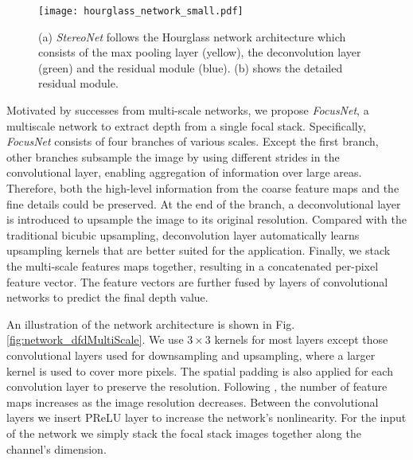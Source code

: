 \documentclass[10pt,twocolumn,letterpaper]{article}
\begin{document}

\begin{figure*}[t]
\begin{center}
   \texttt{[image: hourglass\_network\_small.pdf]}
\end{center}
\vspace{-8pt}
   \caption{(a) \emph{StereoNet} follows the Hourglass network architecture which consists of the max pooling layer (yellow), the deconvolution layer (green) and the residual module (blue). (b) shows the detailed residual module.}
\label{fig:network_hourglass}
\end{figure*}


Motivated by successes from multi-scale networks, we propose \emph{FocusNet}, a multiscale network to extract depth from a single focal stack. Specifically, \emph{FocusNet} consists of four branches of various scales. Except the first branch, other branches subsample the image by using different strides in the convolutional layer, enabling aggregation of information over large areas. Therefore, both the high-level information from the coarse feature maps and the fine details could be preserved. At the end of the branch, a deconvolutional layer is introduced to upsample the image to its original resolution. Compared with the traditional bicubic upsampling, deconvolution layer automatically learns upsampling kernels that are better suited for the application. Finally, we stack the multi-scale features maps together, resulting in a concatenated per-pixel feature vector. The feature vectors are further fused by layers of convolutional networks to predict the final depth value.

An illustration of the network architecture is shown in Fig. \ref{fig:network_dfdMultiScale}. We use $3\times3$ kernels for most layers except those convolutional layers used for downsampling and upsampling, where a larger kernel is used to cover more pixels. The spatial padding is also applied for each convolution layer to preserve the resolution. Following \cite{simonyan14}, the number of feature maps increases as the image resolution decreases. Between the convolutional layers we insert PReLU layer \cite{he15} to increase the network's nonlinearity. For the input of the network we simply stack the focal stack images together along the channel's dimension.
\end{document}
